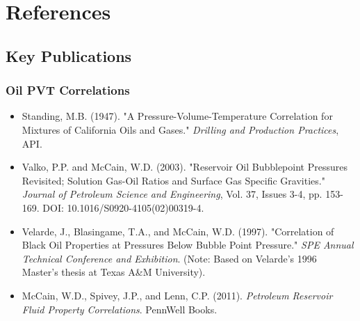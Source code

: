 \documentclass[11pt,a4paper]{article}
\begin{document}
\section{References}

\subsection{Key Publications}

\subsubsection{Oil PVT Correlations}
\begin{itemize}
\item Standing, M.B. (1947). "A Pressure-Volume-Temperature Correlation for Mixtures of California Oils and Gases." \textit{Drilling and Production Practices}, API.
\item Valko, P.P. and McCain, W.D. (2003). "Reservoir Oil Bubblepoint Pressures Revisited; Solution Gas-Oil Ratios and Surface Gas Specific Gravities." \textit{Journal of Petroleum Science and Engineering}, Vol. 37, Issues 3-4, pp. 153-169. DOI: 10.1016/S0920-4105(02)00319-4.
\item Velarde, J., Blasingame, T.A., and McCain, W.D. (1997). "Correlation of Black Oil Properties at Pressures Below Bubble Point Pressure." \textit{SPE Annual Technical Conference and Exhibition}. (Note: Based on Velarde's 1996 Master's thesis at Texas A\&M University).
\item McCain, W.D., Spivey, J.P., and Lenn, C.P. (2011). \textit{Petroleum Reservoir Fluid Property Correlations}. PennWell Books.
\end{itemize}
\end{document}

